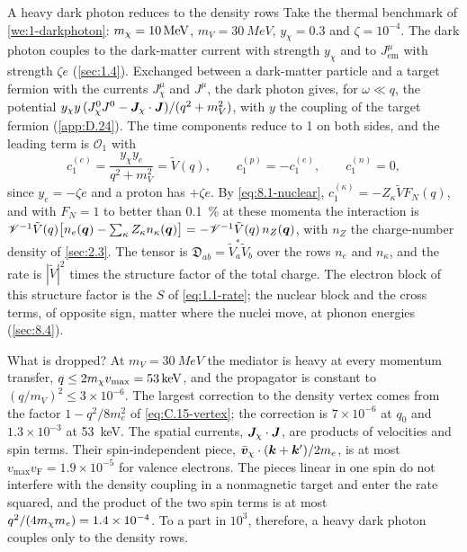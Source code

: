 \begin{workedexample}{A heavy dark photon reduces to the density rows}\label{we:8-darkphoton}
Take the thermal benchmark of \cref{we:1-darkphoton}: $m_{\chi} = \SI{10}{MeV}$, $m_V = \SI{30}{MeV}$, $y_\chi = 0.3$ and $\zeta = 10^{-4}$. The dark photon couples to the dark-matter current with strength $y_\chi$ and to $J^\mu_{\mathrm{em}}$ with strength $\zeta e$ (\cref{sec:1.4}). Exchanged between a dark-matter particle and a target fermion with the currents $J^\mu_\chi$ and $J^\mu$, the dark photon gives, for $\omega \ll q$, the potential $y_\chi y\,(J^0_\chi J^0 - \bm{J}_\chi\cdot\bm{J})/(q^2 + m_V^2)$, with $y$ the coupling of the target fermion (\cref{app:D.24}). The time components reduce to 1 on both sides, and the leading term is $\mathcal{O}_1$ with
\begin{equation*}
  c_1^{(e)} = \frac{y_\chi y_e}{q^2 + m_V^2} = \tilde V(q), \qquad c_1^{(p)} = -c_1^{(e)}, \qquad c_1^{(n)} = 0 ,
\end{equation*}
since $y_e = -\zeta e$ and a proton has $+\zeta e$. By \cref{eq:8.1-nuclear}, $c_1^{(\kappa)} = -Z_\kappa\tilde V F_N(q)$, and with $F_N = 1$ to better than \SI{0.1}{\percent} at these momenta the interaction is $\mathscr{V}^{-1}\tilde V(q)\bigl[n_e(\bm{q}) - \sum_\kappa Z_\kappa n_\kappa(\bm{q})\bigr] = -\mathscr{V}^{-1}\tilde V(q)\,n_Z(\bm{q})$, with $n_Z$ the charge-number density of \cref{sec:2.3}. The tensor is $\mathfrak{D}_{ab} = \tilde V_a^*\tilde V_b$ over the rows $n_e$ and $n_\kappa$, and the rate is $|\tilde V|^2$ times the structure factor of the total charge. The electron block of this structure factor is the $S$ of \cref{eq:1.1-rate}; the nuclear block and the cross terms, of opposite sign, matter where the nuclei move, at phonon energies (\cref{sec:8.4}).

What is dropped? At $m_V = \SI{30}{MeV}$ the mediator is heavy at every momentum transfer, $q \le 2m_{\chi} v_{\mathrm{max}} = \SI{53}{keV}$, and the propagator is constant to $(q/m_V)^2 \le 3\times10^{-6}$. The largest correction to the density vertex comes from the factor $1 - q^2/8m_e^2$ of \cref{eq:C.15-vertex}; the correction is $7\times10^{-6}$ at $q_0$ and $1.3\times10^{-3}$ at \SI{53}{keV}. The spatial currents, $\bm{J}_\chi\cdot\bm{J}$, are products of velocities and spin terms. Their spin-independent piece, $\bar{\bm{v}}_\chi\cdot(\bm{k} + \bm{k}')/2m_e$, is at most $v_{\mathrm{max}}v_{\mathrm{F}} = 1.9\times10^{-5}$ for valence electrons. The pieces linear in one spin do not interfere with the density coupling in a nonmagnetic target and enter the rate squared, and the product of the two spin terms is at most $q^2/(4m_{\chi} m_e) = 1.4\times10^{-4}$. To a part in $10^3$, therefore, a heavy dark photon couples only to the density rows.
\end{workedexample}

